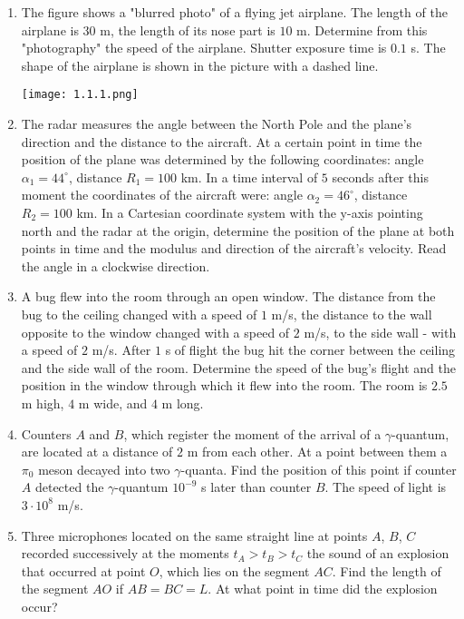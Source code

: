 \documentclass{article}
\begin{document}
\begin{enumerate}[label=1.1.\arabic*]

\item The figure shows a "blurred photo" of a flying jet airplane. The length of the airplane is $30$ m, the length of its nose part is $10$ m. Determine from this "photography" the speed of the airplane. Shutter exposure time is $0.1$ s. The shape of the airplane is shown in the picture with a dashed line.
\begin{center}
    \texttt{[image: 1.1.1.png]}
\end{center}


\item 
The radar measures the angle between the North Pole and the plane's direction and the distance to the aircraft.
At a certain point in time the position of the plane was determined by the following coordinates: angle $\alpha_1 = 44^{\circ}$, distance $R_1 = 100$ km. In a time interval of $5$ seconds after this moment the coordinates of the aircraft were: angle $\alpha_2 = 46^{\circ}$, distance $R_2 = 100$ km. In a Cartesian coordinate system with the y-axis pointing north and the radar at the origin, determine the position of the plane at both points in time and the modulus and direction of the aircraft's velocity. Read the angle in a clockwise direction.

\item A bug flew into the room through an open window. The distance from the bug to the ceiling changed with a speed of $1$ m/s, the distance to the wall opposite to the window changed with a speed of $2$ m/s, to the side wall - with a speed of $2$ m/s. After $1$ s of flight the bug hit the corner between the ceiling and the side wall of the room. Determine the speed of the bug's flight and the position in the window through which it flew into the room. The room is $2.5$ m high, $4$ m wide, and $4$ m long.


\item Counters $A$ and $B$, which register the moment of the arrival of a $\gamma$-quantum, are located at a distance of $2$ m from each other. At a point between them a $\pi_0$ meson decayed into two $\gamma$-quanta. Find the position of this point if counter $A$ detected the $\gamma$-quantum $10^{-9}$ s later than counter $B$. The speed of light is $3 \cdot 10^8$ m/s.

\item Three microphones located on the same straight line at points $A$, $B$, $C$ recorded successively at the moments $t_A > t_B > t_C$ the sound of an explosion that occurred at point $O$, which lies on the segment $AC$. Find the length of the segment $AO$ if $AB = BC = L$. At what point in time did the explosion occur?


\end{enumerate}
\end{document}
